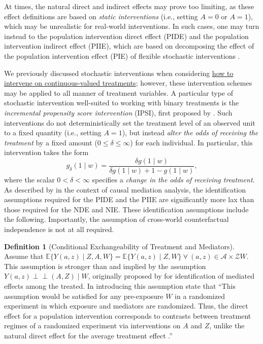 \documentclass[
  12pt, krantz2,
]{krantz}
\newcommand{\E}{\mathbb{E}}
\newcommand{\1}{\mathbbm{1}}
\newcommand{\indep}{\mbox{$\perp\!\!\!\perp$}}
\theoremstyle{definition}
\newtheorem{definition}{Definition}[chapter]
\theoremstyle{definition}
\theoremstyle{definition}
\theoremstyle{definition}
\theoremstyle{remark}
\begin{document}
At times, the natural direct and indirect effects may prove too limiting, as
these effect definitions are based on \emph{static interventions} (i.e., setting
\(A = 0\) or \(A = 1\)), which may be unrealistic for real-world interventions. In
such cases, one may turn instead to the population intervention direct effect
(PIDE) and the population intervention indirect effect (PIIE), which are based
on decomposing the effect of the population intervention effect (PIE) of
flexible stochastic interventions \citep{diaz2020causal}.

We previously discussed stochastic interventions when considering \protect\hyperlink{shift}{how to
intervene on continuous-valued treatments}; however, these intervention
schemes may be applied to all manner of treatment variables.
A particular type of stochastic intervention well-suited to working with binary
treatments is the \emph{incremental propensity score intervention} (IPSI), first
proposed by \citet{kennedy2019nonparametric}. Such interventions do not
deterministically set the treatment level of an observed unit to a fixed
quantity (i.e., setting \(A = 1\)), but instead \emph{alter the odds of receiving the
treatment} by a fixed amount (\(0 \leq \delta \leq \infty\)) for each individual.
In particular, this intervention takes the form
\begin{equation*}
  g_{\delta}(1 \mid w) = \frac{\delta g(1 \mid w)}{\delta g(1 \mid w) + 1
  - g(1\mid w)},
\end{equation*}
where the scalar \(0 < \delta < \infty\) specifies a \emph{change in the odds of
receiving treatment}. As described by \citet{diaz2020causal} in the context of causal
mediation analysis, the identification assumptions required for the PIDE and the
PIIE are significantly more lax than those required for the NDE and NIE. These
identification assumptions include the following. Importantly, the assumption of
cross-world counterfactual independence is not at all required.

\begin{definition}[Conditional Exchangeability of Treatment and Mediators]
Assume that \(\E\{Y(a, z) \mid Z, A, W\} = \E\{Y(a, z) \mid Z, W\}~\forall~(a, z) \in \mathcal{A} \times \mathcal{Z}W\). This assumption is
stronger than and implied by the assumption \(Y(a, z) \indep (A,Z) \mid W\),
originally proposed by \citet{vansteelandt2012natural} for identification of mediated
effects among the treated. In introducing this assumption \citet{diaz2020causal} state
that ``This assumption would be satisfied for any pre-exposure \(W\) in a
randomized experiment in which exposure and mediators are randomized. Thus, the
direct effect for a population intervention corresponds to contrasts between
treatment regimes of a randomized experiment via interventions on \(A\) and \(Z\),
unlike the natural direct effect for the average treatment effect
\citep{robins2010alternative}.''
\end{definition}
\end{document}
